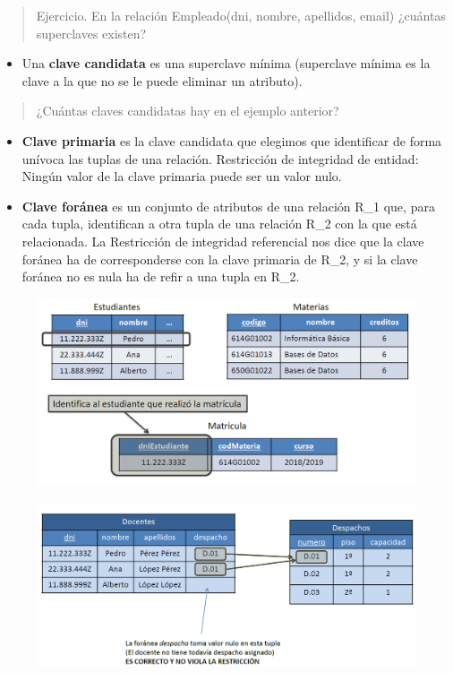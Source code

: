 \documentclass[]{book}
\providecommand{\tightlist}{%
  \setlength{\itemsep}{0pt}\setlength{\parskip}{0pt}}
\begin{document}
\begin{quote}
Ejercicio. En la relación Empleado(dni, nombre, apellidos, email)
¿cuántas superclaves existen?
\end{quote}

\begin{itemize}
\tightlist
\item
  Una \textbf{clave candidata} es una superclave mínima (superclave
  mínima es la clave a la que no se le puede eliminar un atributo).
\end{itemize}

\begin{quote}
¿Cuántas claves candidatas hay en el ejemplo anterior?
\end{quote}

\begin{itemize}
\item
  \textbf{Clave primaria} es la clave candidata que elegimos que
  identificar de forma unívoca las tuplas de una relación. Restricción
  de integridad de entidad: Ningún valor de la clave primaria puede ser
  un valor nulo.
\item
  \textbf{Clave foránea} es un conjunto de atributos de una relación
  R\_1 que, para cada tupla, identifican a otra tupla de una relación
  R\_2 con la que está relacionada. La Restricción de integridad
  referencial nos dice que la clave foránea ha de corresponderse con la
  clave primaria de R\_2, y si la clave foránea no es nula ha de refir a
  una tupla en R\_2.
\end{itemize}

\begin{figure}
\centering
\includegraphics[width=6.25000in]{images/ClaveForanea.png}
\caption{}
\end{figure}

\begin{figure}
\centering
\includegraphics[width=6.25000in]{images/IntegridadReferencial.png}
\caption{}
\end{figure}
\end{document}
